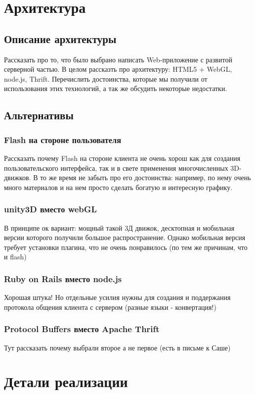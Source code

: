 \documentclass[12pt, a4paper]{article}
\let\stdsection\section
\renewcommand\section{\newpage\stdsection}
\begin{document}
\section{Архитектура}
\subsection{Описание архитектуры}
Рассказать про то, что было выбрано написать Web-приложение с развитой серверной
частью. В целом рассказть про архитектуру: HTML5 + WebGL, node.js, Thrift.
Перечислить достоинства, которые мы получили от использования этих технологий, а
так же обсудить некоторые недостатки.
\subsection{Альтернативы}
\subsubsection{Flash на стороне пользователя}
Рассказать почему Flash на стороне клиента не очень хорош как для создания
пользовательского интерфейса, так и в свете применения многочисленных
3D-движков. В то же время не забыть про его достоинства: например, по нему очень
много материалов и на нем просто сделать богатую и интересную графику.
\subsubsection{unity3D вместо webGL}
В принципе ок вариант: мощный такой 3Д движок, десктопная и мобильная версии
которого получили большое распространение. Однако мобильная версия требует
установки плагина, что не очень понравилось (по тем же причинам, что и flash)
\subsubsection{Ruby on Rails вместо node.js}
Хорошая штука! Но отдельные усилия нужны для создания и поддержания протокола
общения клиента с сервером (разные языки - конвертация!)
\subsubsection{Protocol Buffers вместо Apache Thrift}
Тут рассказать почему выбрали второе а не первое (есть в письме к Саше)

\section{Детали реализации}
\end{document}
